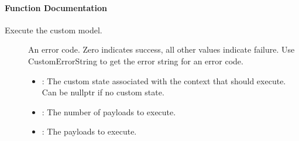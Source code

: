 \documentclass[letterpaper,10pt,english]{sphinxmanual}
\begin{document}
\paragraph{Function Documentation}
\label{\detokenize{cpp_api/function_custom_8h_1afc75c0a4e1a169562586c2d4ff09ba40:function-documentation}}

\begin{fulllineitems}
\label{\detokenize{cpp_api/function_custom_8h_1afc75c0a4e1a169562586c2d4ff09ba40:_CPPv413CustomExecutePv8uint32_tP13CustomPayload22CustomGetNextInputFn_t19CustomGetOutputFn_t}}%
\pysigstartmultiline
{}\label{\detokenize{cpp_api/function_custom_8h_1afc75c0a4e1a169562586c2d4ff09ba40:custom_8h_1afc75c0a4e1a169562586c2d4ff09ba40}}%
\pysigstopmultiline
Execute the custom model. 

\begin{description}
\item[{}] \leavevmode
An error code. Zero indicates success, all other values indicate failure. Use CustomErrorString to get the error string for an error code. 

\item[{}] \leavevmode\begin{itemize}
\item {} 
: The custom state associated with the context that should execute. Can be nullptr if no custom state. 

\item {} 
: The number of payloads to execute. 

\item {} 
: The payloads to execute. 


\end{itemize}
\end{description}
\end{fulllineitems}
\end{document}
